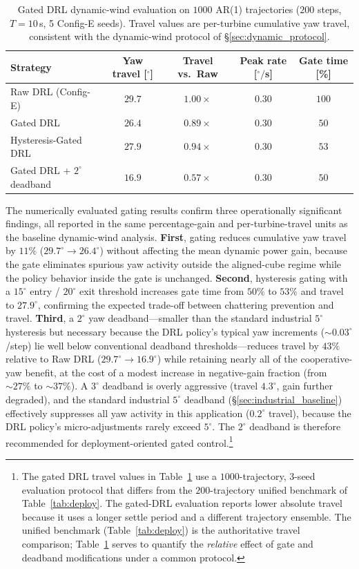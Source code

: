 \documentclass[final,5p,times]{elsarticle}
\begin{document}
\begin{table}[h]
\centering
\caption{Gated DRL dynamic-wind evaluation on $1000$ AR(1) trajectories ($200$ steps, $T{=}10$\,s, 5 Config-E seeds). Travel values are per-turbine cumulative yaw travel, consistent with the dynamic-wind protocol of \S\ref{sec:dynamic_protocol}.}
\label{tab:gated_drl}
\small
\begin{tabular}{lcccc}
\toprule
Strategy & Yaw travel [$^\circ$] & Travel vs.\ Raw & Peak rate [$^\circ\!/$s] & Gate time [\%] \\
\midrule
Raw DRL (Config-E)      & $29.7$  & $1.00{\times}$ & $0.30$ & $100$ \\
Gated DRL               & $\mathbf{26.4}$ & $0.89{\times}$ & $0.30$ & $50$ \\
Hysteresis-Gated DRL    & $27.9$  & $0.94{\times}$ & $0.30$ & $53$ \\
Gated DRL + $2^\circ$ deadband & $\mathbf{16.9}$ & $0.57{\times}$ & $0.30$ & $50$ \\
\bottomrule
\end{tabular}
\end{table}

The numerically evaluated gating results confirm three operationally significant findings, all reported in the same percentage-gain and per-turbine-travel units as the baseline dynamic-wind analysis. \textbf{First}, gating reduces cumulative yaw travel by $11\%$ ($29.7^\circ \rightarrow 26.4^\circ$) without affecting the mean dynamic power gain, because the gate eliminates spurious yaw activity outside the aligned-cube regime while the policy behavior inside the gate is unchanged. \textbf{Second}, hysteresis gating with a $15^\circ$ entry / $20^\circ$ exit threshold increases gate time from $50\%$ to $53\%$ and travel to $27.9^\circ$, confirming the expected trade-off between chattering prevention and travel. \textbf{Third}, a $2^\circ$ yaw deadband---smaller than the standard industrial $5^\circ$ hysteresis but necessary because the DRL policy's typical yaw increments (${\sim}0.03^\circ$/step) lie well below conventional deadband thresholds---reduces travel by $43\%$ relative to Raw DRL ($29.7^\circ \rightarrow 16.9^\circ$) while retaining nearly all of the cooperative-yaw benefit, at the cost of a modest increase in negative-gain fraction (from $\sim\!27\%$ to $\sim\!37\%$). A $3^\circ$ deadband is overly aggressive (travel $4.3^\circ$, gain further degraded), and the standard industrial $5^\circ$ deadband (\S\ref{sec:industrial_baseline}) effectively suppresses all yaw activity in this application ($0.2^\circ$ travel), because the DRL policy's micro-adjustments rarely exceed $5^\circ$. The $2^\circ$ deadband is therefore recommended for deployment-oriented gated control.\footnote{The gated DRL travel values in Table~\ref{tab:gated_drl} use a $1000$-trajectory, 3-seed evaluation protocol that differs from the $200$-trajectory unified benchmark of Table~\ref{tab:deploy}. The gated-DRL evaluation reports lower absolute travel because it uses a longer settle period and a different trajectory ensemble. The unified benchmark (Table~\ref{tab:deploy}) is the authoritative travel comparison; Table~\ref{tab:gated_drl} serves to quantify the \emph{relative} effect of gate and deadband modifications under a common protocol.}
\end{document}
